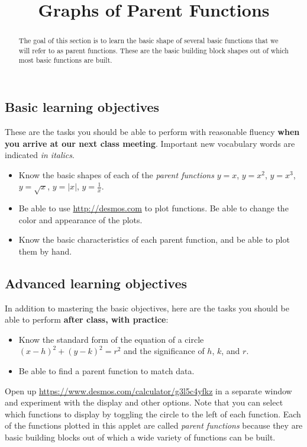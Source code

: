 \documentclass{ximera}
\title{Graphs of Parent Functions}
\begin{document}
\begin{abstract}
The goal of this section is to learn the basic shape of several basic functions that we will refer to as parent functions. These are the basic building block shapes out of which most basic functions are built.
\end{abstract}
\maketitle

\subsection*{Basic learning objectives}

These are the tasks you should be able to perform with reasonable fluency \textbf{when you arrive at our next class meeting}. Important new vocabulary words are indicated \emph{in italics}. 

\begin{itemize}
	\item Know the basic shapes of each of the \emph{parent functions} $y=x$, $y=x^2$, $y=x^3$, $y=\sqrt{x}$, $y=|x|$, $y=\frac{1}{x}$.
	\item Be able to use \url{http://desmos.com} to plot functions. Be able to change the color and appearance of the plots.
	\item Know the basic characteristics of each parent function, and be able to plot them by hand.
\end{itemize}

\subsection*{Advanced learning objectives}

In addition to mastering the basic objectives, here are the tasks you should be able to perform \textbf{after class, with practice}: 

\begin{itemize}
	\item Know the standard form of the equation of a circle $(x-h)^2+(y-k)^2=r^2$ and the significance of $h$, $k$, and $r$.
	\item Be able to find a parent function to match data.
\end{itemize}

\noindent\hrulefill

Open up \url{https://www.desmos.com/calculator/g3l5c4yfkz} in a separate window and experiment with the display and other options. Note that you can select which functions to display by toggling the circle to the left of each function. Each of the functions plotted in this applet are called \emph{parent functions} because they are basic building blocks out of which a wide variety of functions can be built.
\end{document}
